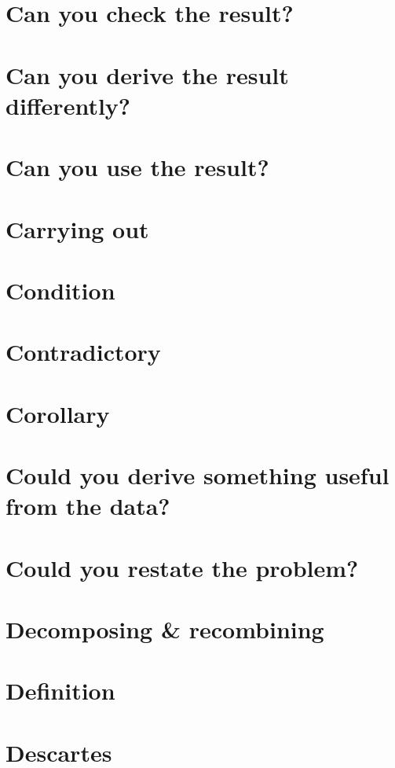 \documentclass[oneside]{book}
\numberwithin{equation}{section}
\begin{document}
\section{Can you check the result?}

\section{Can you derive the result differently?}

\section{Can you use the result?}

\section{Carrying out}

\section{Condition}

\section{Contradictory}

\section{Corollary}

\section{Could you derive something useful from the data?}

\section{Could you restate the problem?}

\section{Decomposing \& recombining}

\section{Definition}

\section{Descartes}
\end{document}
